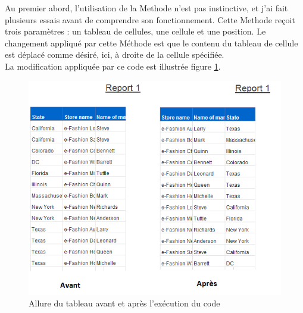 Au premier abord, l'utilisation de la \gls{Methode}  n'est pas instinctive, et j'ai fait plusieurs essais avant de comprendre son fonctionnement. Cette \gls{Methode} re\c{c}oit trois param\`{e}tres : un tableau de cellules, une cellule et une position. Le changement appliqu\'{e} par cette M\'{e}thode est que le contenu du tableau de cellule est d\'{e}plac\'{e} comme d\'{e}sir\'{e}, ici, \`{a} droite de la cellule sp\'{e}cifi\'{e}e.\\
La modification appliqu\'{e}e par ce code est illustr\'{e}e figure \ref{figure:dropcells}.\\

\begin{figure}[!h]
  \centering
      \includegraphics{images/dropcells.png}
  \caption{Allure du tableau avant et apr\`{e}s l'ex\'{e}cution du code}
	\label{figure:dropcells}
\end{figure}





